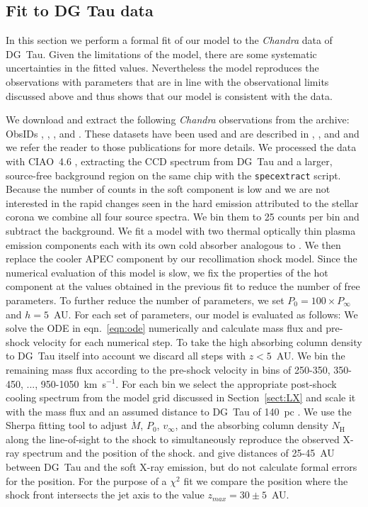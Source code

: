 \subsection{Fit to DG Tau data}
In this section we perform a formal fit of our model to the \emph{Chandra} data of DG~Tau. 
Given the limitations of the model, there are some systematic uncertainties in the fitted values. Nevertheless the model reproduces the observations with parameters that are in line with the observational limits discussed above and thus shows that our model is consistent with the data.

We download and extract the following \emph{Chandra} observations from the archive: ObsIDs , , , and . These datasets have been used and are described in \citet{2008A&A...478..797G}, \citet{2008A&A...488L..13S}, and \citet{2009A&A...493..579G} and we refer the reader to those publications for more details. We processed the data with CIAO~4.6 \citep{2006SPIE.6270E..60F}, extracting the CCD spectrum from DG~Tau and a larger, source-free background region on the same chip with the \texttt{specextract} script. Because the number of counts in the soft component is low and we are not interested in the rapid changes seen in the hard emission attributed to the stellar corona \citep{2008A&A...478..797G} we combine all four source spectra. We bin them to 25 counts per bin and subtract the background. We fit a model with two thermal optically thin plasma emission components \citep[APEC,][]{2012ApJ...756..128F} each with its own cold absorber analogous to \citet{2008A&A...478..797G}. We then replace the cooler APEC component by our recollimation shock model. Since the numerical evaluation of this model is slow, we fix the properties of the hot component at the values obtained in the previous fit to reduce the number of free parameters. To further reduce the number of parameters, we set $P_0 = 100\times P_\infty$ and $h=5$~AU. For each set of parameters, our model is evaluated as follows: We solve the ODE in eqn.~\ref{eqn:ode} numerically and calculate mass flux and pre-shock velocity for each numerical step. To take the high absorbing column density to DG~Tau itself into account we discard all steps with $z<5$~AU. We bin the remaining mass flux according to the pre-shock velocity in bins of 250-350, 350-450, ..., 950-1050~km~s$^{-1}$. For each bin we select the appropriate post-shock cooling spectrum from the model grid discussed in Section~\ref{sect:LX} and scale it with the mass flux and an assumed distance to DG~Tau of 140~pc \citep{1994AJ....108.1872K}. We use the Sherpa fitting tool \citep{2001SPIE.4477...76F} to adjust $\dot M$, $P_0$, $v_\infty$, and the absorbing column density $N_\textrm{H}$ along the line-of-sight to the shock to simultaneously reproduce the observed X-ray spectrum and the position of the shock. \citet{2008A&A...488L..13S} and \citet{2011ASPC..448..617G} give distances of 25-45~AU between DG~Tau and the soft X-ray emission, but do not calculate formal errors for the position. For the purpose of a $\chi^2$ fit we compare the position where the shock front intersects the jet axis to the value $z_{max} = 30\pm5$~AU.

